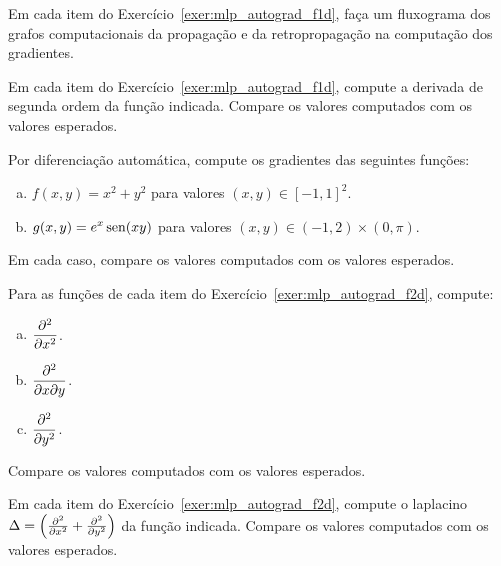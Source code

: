 \begin{exer}
  Em cada item do Exercício~\ref{exer:mlp_autograd_f1d}, faça um fluxograma dos grafos computacionais da propagação e da retropropagação na computação dos gradientes.
\end{exer}

\begin{exer}
  Em cada item do Exercício~\ref{exer:mlp_autograd_f1d}, compute a derivada de segunda ordem da função indicada. Compare os valores computados com os valores esperados.
\end{exer}

\begin{exer}
  Por diferenciação automática, compute os gradientes das seguintes funções:
  \begin{enumerate}[a)]
  \item $\displaystyle f(x,y) = x^2 + y^2$ para valores $(x,y)\in [-1, 1]^2$.
  \item $\displaystyle g(x,y) = e^{x}\operatorname{sen}(xy)$ para valores $(x,y)\in (-1, 2)\times(0, \pi)$.
  \end{enumerate}
  Em cada caso, compare os valores computados com os valores esperados.  
\end{exer}

\begin{exer}\label{exer:mlp_autograd_f2d}
  Para as funções de cada item do Exercício~\ref{exer:mlp_autograd_f2d}, compute:
  \begin{enumerate}[a)]
  \item $\displaystyle\frac{\partial^2}{\partial x^2}$.
  \item $\displaystyle\frac{\partial^2}{\partial x\partial y}$.
  \item $\displaystyle\frac{\partial^2}{\partial y^2}$.
  \end{enumerate}
  Compare os valores computados com os valores esperados.
\end{exer}

\begin{exer}\label{exer:mlp_autograd_f2d}
  Em cada item do Exercício~\ref{exer:mlp_autograd_f2d}, compute o laplacino $\Delta = \left(\frac{\partial^2}{\partial x^2} + \frac{\partial^2}{\partial y^2}\right)$ da função indicada. Compare os valores computados com os valores esperados.
\end{exer}

